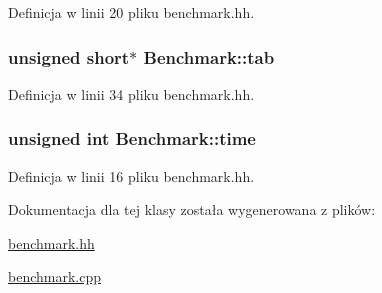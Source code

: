 Definicja w linii 20 pliku benchmark.\-hh.

\hypertarget{class_benchmark_a6046a2f509673ad153a54cdfe3aef5cf}{
\subsubsection[{tab}]{\setlength{\rightskip}{0pt plus 5cm}unsigned short$\ast$ Benchmark\-::tab\hspace{0.3cm}{\ttfamily [protected]}}}\label{class_benchmark_a6046a2f509673ad153a54cdfe3aef5cf}


Definicja w linii 34 pliku benchmark.\-hh.

\hypertarget{class_benchmark_a29f28969213821f07384392192a6bf18}{
\subsubsection[{time}]{\setlength{\rightskip}{0pt plus 5cm}unsigned int Benchmark\-::time\hspace{0.3cm}{\ttfamily [private]}}}\label{class_benchmark_a29f28969213821f07384392192a6bf18}


Definicja w linii 16 pliku benchmark.\-hh.



Dokumentacja dla tej klasy została wygenerowana z plików\-:\begin{DoxyCompactItemize}
\item 
\hyperlink{benchmark_8hh}{benchmark.\-hh}\item 
\hyperlink{benchmark_8cpp}{benchmark.\-cpp}\end{DoxyCompactItemize}
